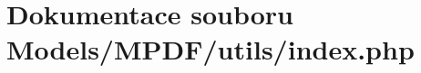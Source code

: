 \hypertarget{_models_2_m_p_d_f_2utils_2index_8php}{\section{Dokumentace souboru Models/\-M\-P\-D\-F/utils/index.php}
\label{_models_2_m_p_d_f_2utils_2index_8php}
}
